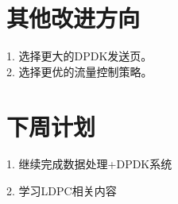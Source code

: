 \documentclass{article}
\begin{document}
\section{其他改进方向}
1. 选择更大的DPDK发送页。\\

2. 选择更优的流量控制策略。\\

\section{下周计划}
1. 继续完成数据处理+DPDK系统

2. 学习LDPC相关内容
\end{document}
